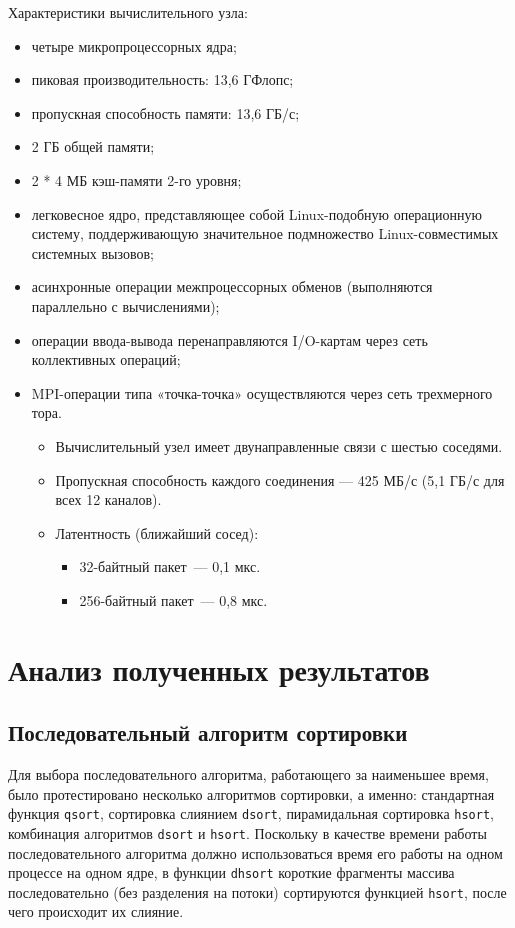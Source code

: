 \documentclass[oneside,final,14pt]{extreport}
\begin{document}
Характеристики вычислительного узла:

\begin{itemize}
    \item четыре микропроцессорных ядра;
    \item пиковая производительность: 13,6 ГФлопс;
    \item пропускная способность памяти: 13,6 ГБ/с;
    \item 2 ГБ общей памяти;
    \item 2 * 4 МБ кэш-памяти 2-го уровня;
    \item легковесное ядро, представляющее собой Linux-подобную операционную систему,
        поддерживающую значительное подмножество Linux-совместимых системных вызовов;
    \item асинхронные операции межпроцессорных обменов (выполняются параллельно с вычислениями);
    \item операции ввода-вывода перенаправляются I/O-картам через сеть коллективных операций;
    \item MPI-операции типа «точка-точка» осуществляются через сеть трехмерного тора.
        \begin{itemize}
            \item Вычислительный узел имеет двунаправленные связи с шестью соседями.
            \item Пропускная способность каждого соединения — 425 МБ/с (5,1 ГБ/с для всех 12
        каналов).
            \item Латентность (ближайший сосед):
                \begin{itemize}
                    \item 32-байтный пакет~--- 0,1 мкс.
                    \item 256-байтный пакет~--- 0,8 мкс.
                \end{itemize}
        \end{itemize}
\end{itemize}


\chapter*{Анализ полученных результатов}

\section*{Последовательный алгоритм сортировки}
\label{seq_alg}
Для выбора последовательного алгоритма, работающего за наименьшее время,
было протестировано несколько алгоритмов сортировки, а именно:
стандартная функция \texttt{qsort}, сортировка слиянием \texttt{dsort},
пирамидальная сортировка \texttt{hsort}, комбинация алгоритмов \texttt{dsort}
и \texttt{hsort}. Поскольку в качестве времени работы последовательного
алгоритма должно использоваться время его работы на одном процессе на одном ядре,
в функции \texttt{dhsort} короткие фрагменты массива последовательно
(без разделения на потоки) сортируются функцией \texttt{hsort}, после
чего происходит их слияние.
\end{document}
